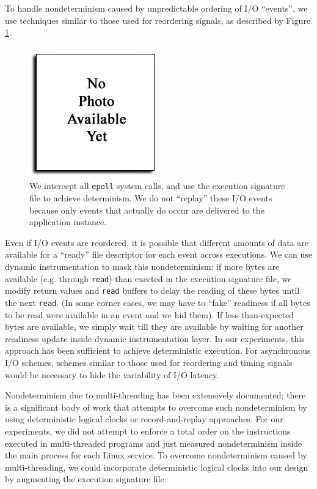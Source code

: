  \newline
To handle nondeterminism caused by unpredictable
ordering of I/O ``events'',
we use techniques similar to those used 
for reordering signals,
as described by Figure \ref{ch3:reorderfig}.

\begin{figure}[h]
  \center
  \includegraphics[trim=0cm 0cm 0cm 0cm, scale=0.75]{none.jpg}
  \caption[Reordering I/O events using Pin]%
  {We intercept all \texttt{epoll} system calls,
    and use the execution signature file to
    achieve determinism. We do not ``replay'' these I/O
    events because only events that actually do occur
    are delivered to the application instance.}
  \label{ch3:reorderfig}
\end{figure} 

Even if I/O events are reordered,
it is possible that different amounts
of data are available for a ``ready''
file descriptor for each event
across executions. We can use
dynamic instrumentation to mask
this nondeterminism: if more bytes
are available (e.g. through \texttt{read}) 
than exected in the execution signature
file, we modify return values and \texttt{read}
buffers to delay the reading of these bytes
until the next \texttt{read}. (In some corner
cases, we may have to ``fake'' readiness
if all bytes to be read were available in an event
and we hid them). If less-than-expected
bytes are available, we simply wait
till they are available by waiting for
another readiness update inside 
dynamic instrumentation layer.
In our experiments, this approach has been sufficient to 
achieve deterministic execution.
For asynchronous I/O schemes, schemes
similar to those used for reordering
and timing signals 
would be necessary to hide
the variability of I/O latency.
\newline

 \newline
Nondeterminism due to multi-threading
has been extensively documented; there
is a significant body of work that
attempts to overcome such nondeterminism
by using deterministic logical clocks
or record-and-replay approaches. 
For our experiments, we did not attempt to enforce
a total order on the instructions executed in multi-threaded
programs and just measured nondeterminism inside 
the main process for each Linux service.
To overcome nondeterminism caused
by multi-threading, we could incorporate
deterministic logical clocks 
into our design by augmenting the
execution signature file.

